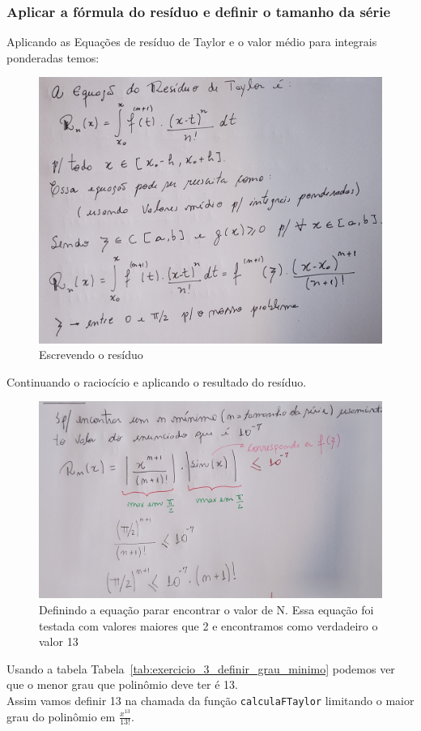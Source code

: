 \subsubsection{Aplicar a fórmula do resíduo e definir o tamanho da série}
Aplicando as Equações de resíduo de Taylor e o valor médio para integrais ponderadas temos:
\begin{figure}[H]
    \centering
    \includegraphics[width=.80\textwidth]{imagens/exercicio3_parte_2}
    \caption{Escrevendo o resíduo}
    \label{fig:lista_exercicio3_parte2}
\end{figure}
Continuando o raciocício e aplicando o resultado do resíduo.
\begin{figure}[H]
    \centering
    \includegraphics[width=.80\textwidth]{imagens/exercicio3_parte_3}
    \caption{Definindo a equação parar encontrar o valor de N. Essa equação foi testada com valores maiores que 2 e encontramos como verdadeiro o valor 13}
    \label{fig:lista_exercicio3_parte3}
\end{figure}



Usando a tabela Tabela~\ref{tab:exercicio_3_definir_grau_minimo} podemos ver que o menor grau que polinômio deve ter é 13. \\
Assim vamos definir 13 na chamada da função \texttt{calculaFTaylor} limitando o maior grau do polinômio em $\frac{x^{13}}{13!}$.


